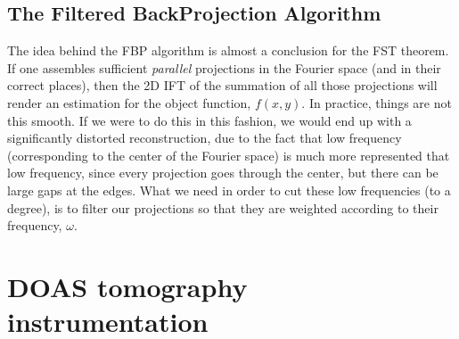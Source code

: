 \subsection{The Filtered BackProjection Algorithm}%
\label{sub:the_filtered_backprojection_algorithm}

The idea behind the \gls{FBP} algorithm is almost a conclusion for the
\gls{FST} theorem. If one assembles sufficient \emph{parallel}
projections in the Fourier space (and in their correct places), then the
2D \gls{IFT} of the summation of all those projections will render an
estimation for the object function, $f(x, y)$. In practice, things are
not this smooth. If we were to do this in this fashion, we
would end up with a significantly distorted reconstruction, due to the
fact that low frequency (corresponding to the center of the Fourier
space) is much more represented that low frequency, since every
projection goes through the center, but there can be large gaps at the
edges. What we need in order to cut these low frequencies (to a degree),
is to filter our projections so that they are weighted according to
their frequency, $\omega$. 



\section{DOAS tomography instrumentation}%
\label{sec:doas_tomography_instrumentation}














